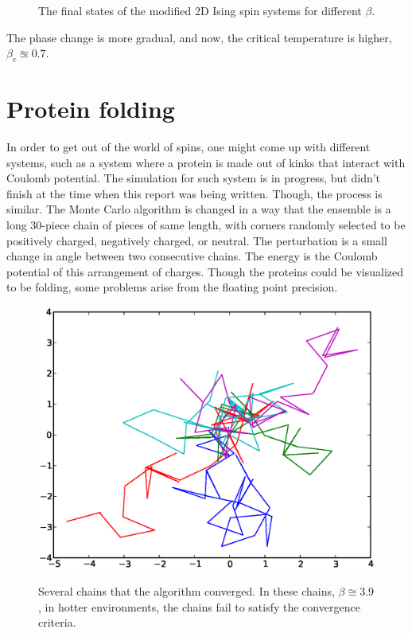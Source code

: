 \begin{figure}[ht]
\label{fig:5ising_states}
\caption{The final states of the modified 2D Ising spin systems for different $ \beta $.}
\end{figure}

The phase change is more gradual, and now, the critical temperature is higher, $ \beta_c \approxeq 0.7 $.

\section{Protein folding}
In order to get out of the world of spins, one might come up with different systems, such as a system where a protein is made out of kinks that interact with Coulomb potential. The simulation for such system is in progress, but didn't finish at the time when this report was being written. Though, the process is similar. The Monte Carlo algorithm is changed in a way that the ensemble is a long 30-piece chain of pieces of same length, with corners randomly selected to be positively charged, negatively charged, or neutral. The perturbation is a small change in angle between two consecutive chains. The energy is the Coulomb potential of this arrangement of charges. Though the proteins could be visualized to be  folding, some problems arise from the floating point precision. 

\begin{figure}[H]
\center
\includegraphics[width=\linewidth]{fig/kink/384242424242.eps}
\label{fig:kink}
\caption{Several chains that the algorithm converged. In these chains, $ \beta \cong 3.9 $, in hotter environments, the chains fail to satisfy the convergence criteria. }
\end{figure}



